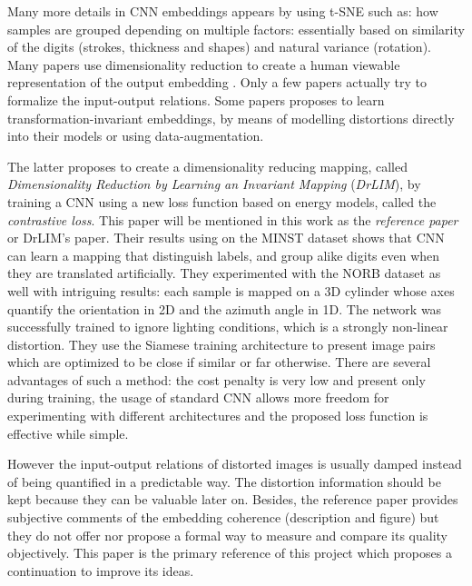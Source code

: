\documentclass[a4paper,12pt]{report}
\begin{document}
Many more details in CNN embeddings appears by using t-SNE such as: how samples are grouped depending on multiple factors: essentially based on similarity of the digits (strokes, thickness and shapes) and natural variance (rotation).
Many papers use dimensionality reduction to create a human viewable representation of the output embedding \cite{donahue2013decaf}\cite{yu2014visualizing}\cite{yaotiny}.
Only a few papers actually try to formalize the input-output relations\cite{goodfellow2009measuring}.
Some papers proposes to learn transformation-invariant embeddings, by means of modelling distortions directly into their models\cite{gens2014deep} or using data-augmentation\cite{hadsell2006dimensionality}.

The latter proposes to create a dimensionality reducing mapping, called {\em Dimensionality Reduction by Learning an Invariant Mapping} ({\em DrLIM}), by training a CNN using a new loss function based on energy models, called the {\em contrastive loss}.
This paper will be mentioned in this work as the {\em reference paper} or DrLIM's paper.
Their results using on the MINST dataset\cite{lecun1998mnist} shows that CNN can learn a mapping that distinguish labels, and group alike digits even when they are translated artificially.
They experimented with the NORB dataset\cite{lecun2004learning} as well with intriguing results: each sample is mapped on a 3D cylinder whose axes quantify the orientation in 2D and the azimuth angle in 1D.
The network was successfully trained to ignore lighting conditions, which is a strongly non-linear distortion.
They use the Siamese training architecture to present image pairs which are optimized to be close if similar or far otherwise\cite{bromley1993signature}\cite{chopra2005learning}.
There are several advantages of such a method: the cost penalty is very low and present only during training, the usage of standard CNN allows more freedom for experimenting with different architectures and the proposed loss function is effective while simple.

However the input-output relations of distorted images is usually damped instead of being quantified in a predictable way.
The distortion information should be kept because they can be valuable later on.
Besides, the reference paper provides subjective comments of the embedding coherence (description and figure) but they do not offer nor propose a formal way to measure and compare its quality objectively.
This paper is the primary reference of this project which proposes a continuation to improve its ideas.
\end{document}
